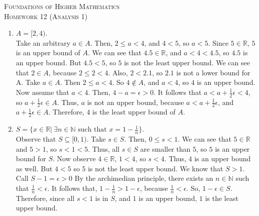 \documentclass{article}
\theoremstyle{problem}
\theoremstyle{plain}
\theoremstyle{remark}
\begin{document}
\begin{center}
  \textsc{\Large Foundations of Higher Mathematics}\\[.3cm]
  \textsc{\Large Homework 12 (Analysis 1)}
\end{center}

\begin{enumerate}
\item $A = [2,4)$.\\
  Take an arbitrary $a \in A$.
  Then, $2 \leq a < 4$, and $4 < 5$, so $a < 5$.
  Since $5 \in \mathbb{R}$, $5$ is an upper bound of $A$.
  We can see that $4.5 \in \mathbb{R}$, and $a < 4 < 4.5$, so $4.5$ is an upper bound.
  But $4.5 < 5$, so $5$ is not the least upper bound.
  We can see that $2 \in A$, because $2 \leq 2 < 4$.
  Also, $2 < 2.1$, so $2.1$ is not a lower bound for A.
  Take $a \in A$. Then $2 \leq a < 4$. So $4 \not \in A$, and $a < 4$, so $4$ is an upper bound.
  Now assume that $a < 4$.
  Then, $4 - a = \epsilon > 0$.
  It follows that $a < a + \frac{1}{2} \epsilon < 4$, so $a + \frac{1}{2} \epsilon \in A$.  
  Thus, $a$ is not an upper bound, because $a < a + \frac{1}{2} \epsilon$, and $a + \frac{1}{2} \epsilon \in A$.
  Therefore, $4$ is the least upper bound of $A$.

\item $S = \{x \in \mathbb{R}|\ \exists n \in \mathbb{N} \text{ such that } x = 1 - \frac{1}{n}\}$.\\
  Observe that $S \subseteq [0,1)$.
    Take $s \in S$.
    Then, $0 \leq s < 1$.
    We can see that $5 \in \mathbb{R}$ and $5 > 1$, so $s < 1 < 5$.
    Thus, all $s \in S$ are smaller than $5$, so $5$ is an upper bound for $S$.
    Now observe $4 \in \mathbb{R}$, $1 < 4$, so $s < 4$.
    Thus, $4$ is an upper bound as well.
    But $4 < 5$ so $5$ is not the least upper bound.
    We know that $S > 1$.
    Call $S - 1 = \epsilon > 0$
    By the archimedian principle, there exists an $n \in \mathbb{N}$ such that $\frac{1}{n} < \epsilon$.
    It follows that, $1 - \frac{1}{n} > 1 - \epsilon$, because $\frac{1}{n} < \epsilon$.
    So, $1 - \epsilon \in S$.
    Therefore, since all $s < 1$ is in $S$, and $1$ is an upper bound, $1$ is the least upper bound.
    

\end{enumerate}
\end{document}
